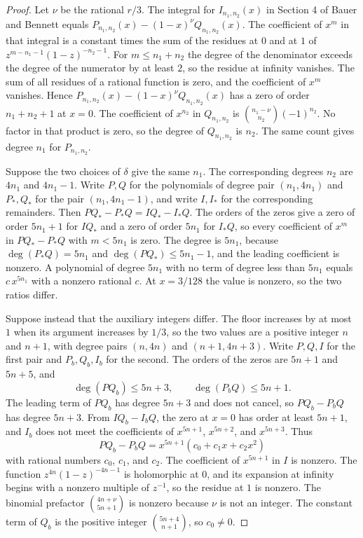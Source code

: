\documentclass[11pt]{article}
\begin{document}
\begin{proof}
Let $\nu$ be the rational $r/3$.
The integral for $I_{n_1,n_2}(x)$ in Section 4 of Bauer and Bennett equals $P_{n_1,n_2}(x) - (1 - x)^\nu Q_{n_1,n_2}(x)$.
The coefficient of $x^m$ in that integral is a constant times the sum of the residues at $0$ and at $1$ of $z^{m - n_1 - 1}(1 - z)^{-n_2 - 1}$.
For $m \le n_1 + n_2$ the degree of the denominator exceeds the degree of the numerator by at least $2$, so the residue at infinity vanishes.
The sum of all residues of a rational function is zero, and the coefficient of $x^m$ vanishes.
Hence $P_{n_1,n_2}(x) - (1 - x)^\nu Q_{n_1,n_2}(x)$ has a zero of order $n_1 + n_2 + 1$ at $x = 0$.
The coefficient of $x^{n_2}$ in $Q_{n_1,n_2}$ is $\binom{n_1 - \nu}{n_2}(-1)^{n_2}$.
No factor in that product is zero, so the degree of $Q_{n_1,n_2}$ is $n_2$.
The same count gives degree $n_1$ for $P_{n_1,n_2}$.

Suppose the two choices of $\delta$ give the same $n_1$.
The corresponding degrees $n_2$ are $4n_1$ and $4n_1 - 1$.
Write $P, Q$ for the polynomials of degree pair $(n_1, 4n_1)$ and $P_*, Q_*$ for the pair $(n_1, 4n_1 - 1)$, and write $I, I_*$ for the corresponding remainders.
Then $P Q_* - P_* Q = I Q_* - I_* Q$.
The orders of the zeros give a zero of order $5n_1 + 1$ for $I Q_*$ and a zero of order $5n_1$ for $I_* Q$, so every coefficient of $x^m$ in $P Q_* - P_* Q$ with $m < 5n_1$ is zero.
The degree is $5n_1$, because $\deg(P_* Q) = 5n_1$ and $\deg(P Q_*) \le 5n_1 - 1$, and the leading coefficient is nonzero.
A polynomial of degree $5n_1$ with no term of degree less than $5n_1$ equals $c\, x^{5n_1}$ with a nonzero rational $c$.
At $x = 3/128$ the value is nonzero, so the two ratios differ.

Suppose instead that the auxiliary integers differ.
The floor increases by at most $1$ when its argument increases by $1/3$, so the two values are a positive integer $n$ and $n + 1$, with degree pairs $(n, 4n)$ and $(n + 1, 4n + 3)$.
Write $P, Q, I$ for the first pair and $P_b, Q_b, I_b$ for the second.
The orders of the zeros are $5n + 1$ and $5n + 5$, and
\[
\deg(P Q_b) \le 5n + 3, \qquad \deg(P_b Q) \le 5n + 1.
\]
The leading term of $P Q_b$ has degree $5n + 3$ and does not cancel, so $P Q_b - P_b Q$ has degree $5n + 3$.
From $I Q_b - I_b Q$, the zero at $x = 0$ has order at least $5n + 1$, and $I_b$ does not meet the coefficients of $x^{5n + 1}$, $x^{5n + 2}$, and $x^{5n + 3}$.
Thus
\[
P Q_b - P_b Q = x^{5n + 1}(c_0 + c_1 x + c_2 x^2)
\]
with rational numbers $c_0$, $c_1$, and $c_2$.
The coefficient of $x^{5n + 1}$ in $I$ is nonzero.
The function $z^{4n}(1 - z)^{-4n - 1}$ is holomorphic at $0$, and its expansion at infinity begins with a nonzero multiple of $z^{-1}$, so the residue at $1$ is nonzero.
The binomial prefactor $\binom{4n + \nu}{5n + 1}$ is nonzero because $\nu$ is not an integer.
The constant term of $Q_b$ is the positive integer $\binom{5n + 4}{n + 1}$, so $c_0 \ne 0$.


\end{proof}
\end{document}
